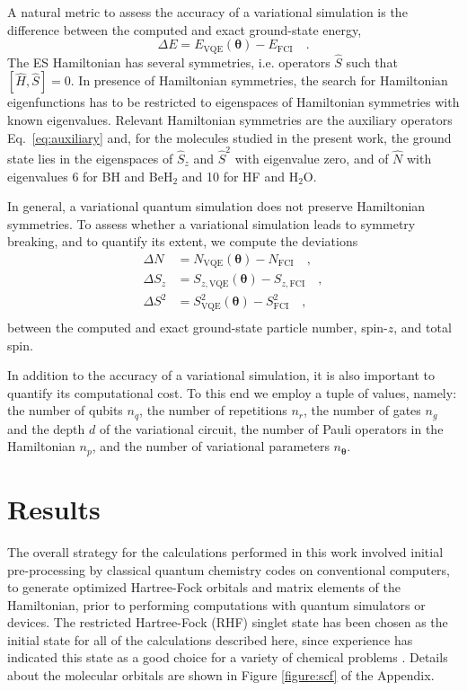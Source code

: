 \documentclass[aps,pra,onecolumn]{revtex4-2}
\newcommand{\bgreek}[1]{{\boldsymbol{#1}}}
\begin{document}
A natural metric to assess the accuracy of a variational simulation is the difference between the computed and exact ground-state energy, 
\begin{equation}
\Delta E = E_{\mathrm{VQE}}(\bgreek{\theta}) - E_{\mathrm{FCI}}
\quad .
\end{equation}
The ES Hamiltonian has several symmetries, i.e. operators $\hat{S}$ such that $[\hat{H},\hat{S}]=0$. 
In presence of Hamiltonian symmetries, the search for Hamiltonian eigenfunctions has to be restricted to eigenspaces of Hamiltonian symmetries with known eigenvalues.
Relevant Hamiltonian symmetries are the auxiliary operators Eq.~\eqref{eq:auxiliary}
and, for the molecules studied in the present work, the ground state lies in the eigenspaces of $\hat{S}_z$ and $\hat{S}^2$ with eigenvalue zero,
and of $\hat{N}$ with eigenvalues $6$ for BH and BeH$_2$ and 10 for HF and H$_2$O.

In general, a variational quantum simulation does not preserve Hamiltonian symmetries. To assess whether a variational simulation
leads to symmetry breaking, and to quantify its extent, we compute the deviations
\begin{equation}
\begin{split}
\Delta N &= N_{\mathrm{VQE}}(\bgreek{\theta}) - N_{\mathrm{FCI}} \quad, \\
\Delta S_z &= S_{z,\mathrm{VQE}}(\bgreek{\theta}) - S_{z,\mathrm{FCI}} \quad, \\
\Delta S^2 &= S^2_{\mathrm{VQE}}(\bgreek{\theta}) - S^2_{\mathrm{FCI}} \quad, \\
\end{split}
\end{equation}
between the computed and exact ground-state particle number, spin-$z$, and total spin.

In addition to the accuracy of a variational simulation, it is also important to quantify its computational cost. To this end we employ a tuple of values,
namely: 
the number of qubits $n_q$,  
the number of repetitions $n_r$,  
the number of gates $n_g$ and the depth $d$ of the variational circuit, 
the number of Pauli operators in the Hamiltonian $n_p$, 
and the number of variational parameters $n_{\bgreek{\theta}}$.

\section{Results}
\label{sec:results}

The overall strategy for the calculations performed in this work involved initial pre-processing by classical quantum chemistry codes on conventional computers, 
to generate optimized Hartree-Fock orbitals and matrix elements of the Hamiltonian, prior to performing computations with quantum simulators or devices.
The restricted Hartree-Fock (RHF) singlet state has been chosen as the initial state for all of the calculations described here, 
since experience has indicated this state as a good choice for a variety of chemical problems \cite{romero2018strategies}. 
Details about the molecular orbitals are shown in Figure \ref{figure:scf} of the Appendix.
\end{document}
